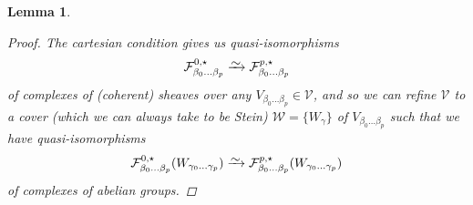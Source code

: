 \documentclass[11pt,fleqn]{article}
\theoremstyle{plain}
\newtheorem{lemma}[theorem]{Lemma}
\theoremstyle{definition}
\theoremstyle{remark}
\numberwithin{equation}{theorem}
\newcommand{\anothercover}{\mathcal{V}}
\newcommand{\yetanothercover}{\mathcal{W}}
\newcommand{\anotherbullet}{\star}
\newcommand{\congto}{\xrightarrow{\raisebox{-.5ex}[0ex][0ex]{$\sim$}}}
\begin{document}
\begin{lemma}
\begin{proof}
                The cartesian condition gives us quasi-isomorphisms
                \[
                    \mathcal{F}_{\beta_0\ldots\beta_p}^{0,\anotherbullet}
                    \congto
                    \mathcal{F}_{\beta_0\ldots\beta_p}^{p,\anotherbullet}
                \]
                of complexes of (coherent) sheaves over any $V_{\beta_0\ldots\beta_p}\in\anothercover$, and so we can refine $\anothercover$ to a cover (which we can always take to be Stein) $\yetanothercover=\{W_\gamma\}$ of $V_{\beta_0\ldots\beta_p}$ such that we have quasi-isomorphisms
                \begin{equation}
                \label{equation:q-iso-of-sections}
                    \mathcal{F}_{\beta_0\ldots\beta_p}^{0,\anotherbullet}(W_{\gamma_0\ldots\gamma_p})
                    \congto
                    \mathcal{F}_{\beta_0\ldots\beta_p}^{p,\anotherbullet}(W_{\gamma_0\ldots\gamma_p})
                \end{equation}
                of complexes of abelian groups.


\end{proof}
\end{lemma}
\end{document}
